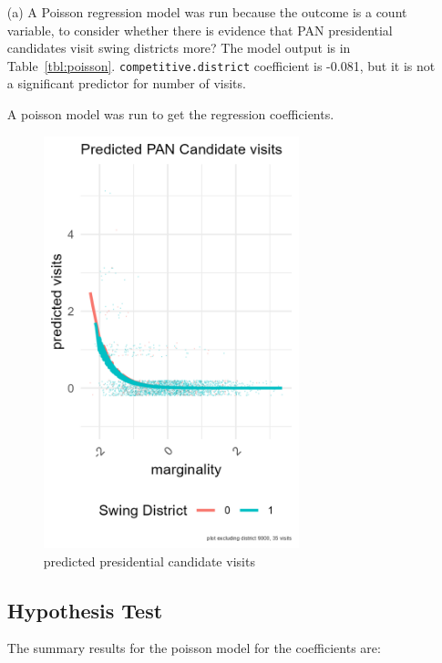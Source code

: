 \documentclass[12pt,letterpaper]{article}
\begin{document}
\begin{enumerate}
	\item [(a)] A Poisson regression model was run because the outcome is a count variable, to consider whether there is evidence that PAN presidential candidates visit swing districts more?  The model output is in Table~\ref{tbl:poisson}. \texttt{competitive.district} coefficient is -0.081, but it is not a significant predictor for number of visits.
    

  A poisson model was run to get the regression coefficients.  
    

  \begin{figure}[!htbp]
	  \includegraphics[width=0.7\textwidth,height=0.5\textheight]{graphics/mex_pred.png}
	  \caption{predicted presidential candidate visits}
	  \label{fig:mex:pred}
	\end{figure}

	\subsection*{Hypothesis Test}
    The summary results for the poisson model for the coefficients are:


\end{enumerate}
\end{document}
